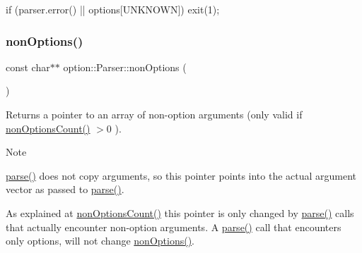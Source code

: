 \begin{DoxyCode}
\textcolor{keywordflow}{if} (parser.error() || options[UNKNOWN])
  exit(1);
\end{DoxyCode}
 \mbox{\label{classoption_1_1_parser_a2c11b050f4248d71758dda52c5f9154d}} 
\subsubsection{\texorpdfstring{non\+Options()}{nonOptions()}}
{\footnotesize\ttfamily const char$\ast$$\ast$ option\+::\+Parser\+::non\+Options (\begin{DoxyParamCaption}{ }\end{DoxyParamCaption})\hspace{0.3cm}{\ttfamily [inline]}}



Returns a pointer to an array of non-\/option arguments (only valid if {\ttfamily \hyperlink{classoption_1_1_parser_aa64a6a7c196993a1b20d48e8ddd12a34}{non\+Options\+Count()} $>$0 }). 

\begin{DoxyNote}{Note}
\begin{DoxyItemize}
\item \hyperlink{classoption_1_1_parser_a6e0b5778d1cfbd6cd51240e74d01e138}{parse()} does not copy arguments, so this pointer points into the actual argument vector as passed to \hyperlink{classoption_1_1_parser_a6e0b5778d1cfbd6cd51240e74d01e138}{parse()}. \item As explained at \hyperlink{classoption_1_1_parser_aa64a6a7c196993a1b20d48e8ddd12a34}{non\+Options\+Count()} this pointer is only changed by \hyperlink{classoption_1_1_parser_a6e0b5778d1cfbd6cd51240e74d01e138}{parse()} calls that actually encounter non-\/option arguments. A \hyperlink{classoption_1_1_parser_a6e0b5778d1cfbd6cd51240e74d01e138}{parse()} call that encounters only options, will not change \hyperlink{classoption_1_1_parser_a2c11b050f4248d71758dda52c5f9154d}{non\+Options()}. \end{DoxyItemize}

\end{DoxyNote}
\mbox{\label{classoption_1_1_parser_aa64a6a7c196993a1b20d48e8ddd12a34}} 
